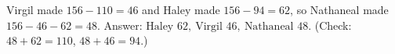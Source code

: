 Virgil made $156-110=46$ and Haley made $156-94=62$, so Nathaneal made $156-46-62=48$. Answer: $\boxed{\text{Haley }62,\ \text{Virgil }46,\ \text{Nathaneal }48}$. (Check: $48+62=110$, $48+46=94$.)
